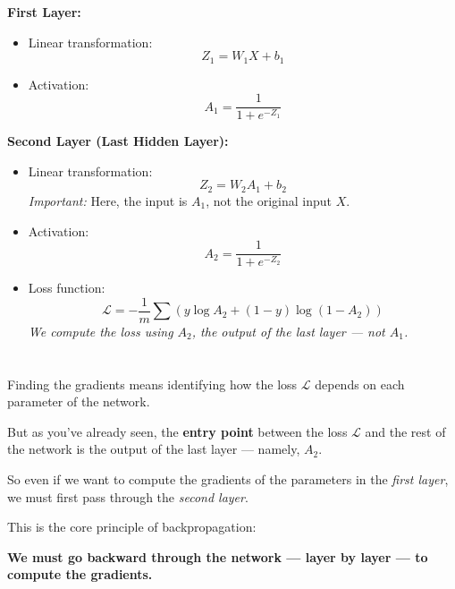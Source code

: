\documentclass[11pt]{article}
\begin{document}
\vspace{0.5em}

\textbf{First Layer:}
\begin{itemize}
    \item Linear transformation:
    \[
    Z_1 = W_1 X + b_1
    \]
    \item Activation:
    \[
    A_1 = \frac{1}{1 + e^{-Z_1}}
    \]
\end{itemize}

\vspace{0.5em}

\textbf{Second Layer (Last Hidden Layer):}
\begin{itemize}
    \item Linear transformation:
    \[
    Z_2 = W_2 A_1 + b_2
    \]
    \textit{Important:} Here, the input is $A_1$, not the original input $X$.

    \item Activation:
    \[
    A_2 = \frac{1}{1 + e^{-Z_2}}
    \]

    \item Loss function:
    \[
    \mathcal{L} = -\frac{1}{m} \sum \left( y \log A_2 + (1 - y) \log(1 - A_2) \right)
    \]
    \textit{We compute the loss using $A_2$, the output of the last layer — not $A_1$.}
\end{itemize}

\section*{}

Finding the gradients means identifying how the loss $\mathcal{L}$ depends on each parameter of the network.

But as you’ve already seen, the \textbf{entry point} between the loss $\mathcal{L}$ and the rest of the network is the output of the last layer — namely, $A_2$.

So even if we want to compute the gradients of the parameters in the \textit{first layer},  
we must first pass through the \textit{second layer}.

\vspace{0.5em}

\begin{tcolorbox}[colback=green!5!white, colframe=green!60!black, title=Key Insight]
This is the core principle of backpropagation:

\textbf{We must go backward through the network — layer by layer — to compute the gradients.}
\end{tcolorbox}
\end{document}
